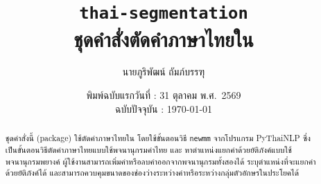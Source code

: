\documentclass[a4paper,article,openany,12pt]{memoir}
\begin{document}
\title{\texttt{thai-segmentation} \\ ชุดคำสั่งตัดคำภาษาไทยใน \lualatexlogo}
\author{นายภูริพัฒน์ ถัมภ์บรรฑุ}
\date{พิมพ์ฉบับแรกวันที่ : 31 ตุลาคม พ.ศ.\ 2569 \\ ฉบับปัจจุบัน : \today}
\maketitle

\begin{abstract}
  ชุดคำสั่งนี้ (package) ใช้ตัดคำภาษาไทยใน \lualatexlogo โดยใช้ขั้นตอนวิธี \texttt{newmm} จากโปรแกรม PyThaiNLP \parencite{pythainlp-proceedings}
  ซึ่งเป็นขั้นตอนวิธีตัดคำภาษาไทยแบบใช้พจนานุกรมคำไทย และ หาตำแหน่งแยกคำด้วยยัติภังค์แบบใช้พจนานุกรมพยางค์
  ผู้ใช้งานสามารถเพิ่มคำหรือลบคำออกจากพจนานุกรมทั้งสองได้
  ระบุตำแหน่งที่จะแยกคำด้วยยัติภังค์ได้
  และสามารถควบคุมขนาดของช่องว่างระหว่างคำหรือระหว่างกลุ่มตัวอักษรในประโยคได้
\end{abstract}

\tableofcontents*





\appendix



\printbibliography[title=บรรณานุกรม]
\end{document}
